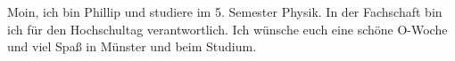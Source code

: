 \begin{multicols}{2}
{
Moin, ich bin Phillip und studiere im 5. Semester Physik. In der Fachschaft bin ich für den Hochschultag verantwortlich. Ich wünsche euch eine schöne O-Woche und viel Spaß in Münster und beim Studium. 
}



\end{multicols}
